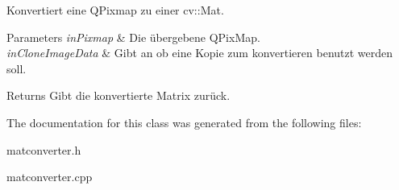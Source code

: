 Konvertiert eine Q\+Pixmap zu einer cv\+::\+Mat. 


\begin{DoxyParams}{Parameters}
{\em in\+Pixmap} & Die übergebene Q\+Pix\+Map. \\
\hline
{\em in\+Clone\+Image\+Data} & Gibt an ob eine Kopie zum konvertieren benutzt werden soll. \\
\hline
\end{DoxyParams}
\begin{DoxyReturn}{Returns}
Gibt die konvertierte Matrix zurück. 
\end{DoxyReturn}


The documentation for this class was generated from the following files\+:\begin{DoxyCompactItemize}
\item 
matconverter.\+h\item 
matconverter.\+cpp\end{DoxyCompactItemize}
